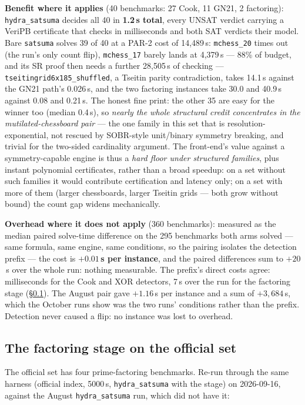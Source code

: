 \documentclass[10pt]{article}
\begin{document}
\textbf{Benefit where it applies} (40 benchmarks: 27 Cook, 11 GN21, 2
factoring): \texttt{hydra\_satsuma} decides all 40 in \textbf{1.2\,s
total}, every UNSAT verdict carrying a VeriPB certificate that checks
in milliseconds and both SAT verdicts their model. Bare
\texttt{satsuma} solves 39 of 40 at a PAR-2 cost of 14{,}489\,s:
\texttt{mchess\_20} times out (the run's only count flip),
\texttt{mchess\_17} barely lands at 4{,}379\,s --- 88\% of budget,
and its SR proof then needs a further 28{,}505\,s of checking ---
\texttt{tseitingrid6x185\_shuffled}, a Tseitin parity contradiction,
takes 14.1\,s against the GN21 path's 0.026\,s, and the two factoring
instances take 30.0 and 40.9\,s against 0.08 and 0.21\,s. The honest
fine print: the other 35 are easy for the winner too (median 0.4\,s),
so \emph{nearly the whole structural credit concentrates in the
mutilated-chessboard pair} --- the one family in this set that is
resolution-exponential, not rescued by SOBR-style unit/binary
symmetry breaking, and trivial for the two-sided cardinality
argument. The front-end's value against a symmetry-capable engine is
thus a \emph{hard floor under structured families}, plus instant
polynomial certificates, rather than a broad speedup: on a set
without such families it would contribute certification and latency
only; on a set with more of them (larger chessboards, larger Tseitin
grids --- both grow without bound) the count gap widens mechanically.

\textbf{Overhead where it does not apply} (360 benchmarks): measured as
the median paired solve-time difference on the 295 benchmarks both arms
solved --- same formula, same engine, same conditions, so the pairing
isolates the detection prefix --- the cost is \textbf{$+0.01$\,s per
instance}, and the paired differences sum to $+20$\,s over the whole
run: nothing measurable. The prefix's direct costs agree: milliseconds
for the Cook and XOR detectors, 7\,s over the run for the factoring
stage (\S\ref{sec:factoring-results}). The August pair gave $+1.16$\,s
per instance and a sum of $+3{,}684$\,s, which the October runs show
was the two runs' conditions rather than the prefix. Detection never
caused a flip: no instance was lost to overhead.

\subsection{The factoring stage on the official set}
\label{sec:factoring-results}

The official set has four prime-factoring benchmarks. Re-run through the
same harness (official index, 5000\,s, \texttt{hydra\_satsuma} with
the stage) on 2026-09-16, against the August \texttt{hydra\_satsuma}
run, which did not have it:
\end{document}
